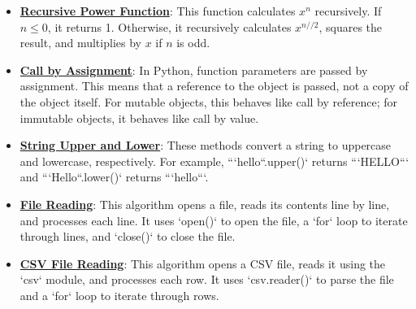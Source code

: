 \documentclass{article}%
\begin{document}
\begin{itemize}[leftmargin=*]%
\item \href{https://purdue.brightspace.com/d2l/common/assets/pdfjs-d2l-dist/1.0.14-legacy/web/viewer.html?file=\%2Fcontent\%2Fenforced\%2F1095465-WL.202510.CS24200.LE1\%2F02L1-python.pdf\%3Fou\%3D1095465\&lang=en-us\&container=d2l-fileviewer-rendered-pdf\&fullscreen=d2l-fileviewer-rendered-pdf-dialog\&height=667#page=36}{\textbf{Recursive Power Function}}: This function calculates $x^n$ recursively. If $n \le 0$, it returns 1. Otherwise, it recursively calculates $x^{n//2}$, squares the result, and multiplies by $x$ if $n$ is odd.%
\item \href{https://purdue.brightspace.com/d2l/common/assets/pdfjs-d2l-dist/1.0.14-legacy/web/viewer.html?file=\%2Fcontent\%2Fenforced\%2F1095465-WL.202510.CS24200.LE1\%2F02L1-python.pdf\%3Fou\%3D1095465\&lang=en-us\&container=d2l-fileviewer-rendered-pdf\&fullscreen=d2l-fileviewer-rendered-pdf-dialog\&height=667#page=38}{\textbf{Call by Assignment}}: In Python, function parameters are passed by assignment. This means that a reference to the object is passed, not a copy of the object itself. For mutable objects, this behaves like call by reference; for immutable objects, it behaves like call by value.%
\item \href{https://purdue.brightspace.com/d2l/common/assets/pdfjs-d2l-dist/1.0.14-legacy/web/viewer.html?file=\%2Fcontent\%2Fenforced\%2F1095465-WL.202510.CS24200.LE1\%2F02L1-python.pdf\%3Fou\%3D1095465\&lang=en-us\&container=d2l-fileviewer-rendered-pdf\&fullscreen=d2l-fileviewer-rendered-pdf-dialog\&height=667#page=35}{\textbf{String Upper and Lower}}: These methods convert a string to uppercase and lowercase, respectively. For example, ```hello``.upper()` returns ```HELLO``` and ```Hello``.lower()` returns ```hello```.%
\item \href{https://purdue.brightspace.com/d2l/common/assets/pdfjs-d2l-dist/1.0.14-legacy/web/viewer.html?file=\%2Fcontent\%2Fenforced\%2F1095465-WL.202510.CS24200.LE1\%2F02L1-python.pdf\%3Fou\%3D1095465\&lang=en-us\&container=d2l-fileviewer-rendered-pdf\&fullscreen=d2l-fileviewer-rendered-pdf-dialog\&height=667#page=46}{\textbf{File Reading}}: This algorithm opens a file, reads its contents line by line, and processes each line. It uses `open()` to open the file, a `for` loop to iterate through lines, and `close()` to close the file.%
\item \href{https://purdue.brightspace.com/d2l/common/assets/pdfjs-d2l-dist/1.0.14-legacy/web/viewer.html?file=\%2Fcontent\%2Fenforced\%2F1095465-WL.202510.CS24200.LE1\%2F02L1-python.pdf\%3Fou\%3D1095465\&lang=en-us\&container=d2l-fileviewer-rendered-pdf\&fullscreen=d2l-fileviewer-rendered-pdf-dialog\&height=667#page=46}{\textbf{CSV File Reading}}: This algorithm opens a CSV file, reads it using the `csv` module, and processes each row. It uses `csv.reader()` to parse the file and a `for` loop to iterate through rows.%
\end{itemize}%
\end{document}
